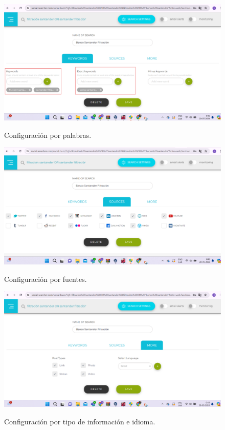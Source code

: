 \documentclass[stu, 11pt, letterpaper, donotrepeattitle, floatsintext, natbib]{apa7}
\begin{document}
\begin{figure}[H]
\centering
\caption{Configuración por palabras. }
\includegraphics[width=0.75\linewidth]{osi10.png} %
\label{fig:OverallEffect}
\end{figure}

\begin{figure}[H]
\centering
\caption{Configuración por fuentes. }
\includegraphics[width=0.75\linewidth]{osi11.png} %
\label{fig:OverallEffect}
\end{figure}

\begin{figure}[H]
\centering
\caption{Configuración por tipo de información e idioma.}
\includegraphics[width=0.75\linewidth]{osi12.png} %
\label{fig:OverallEffect}
\end{figure}
\end{document}

